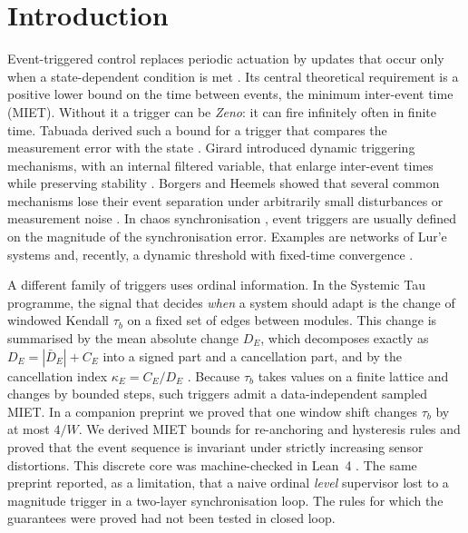 \documentclass[10pt,a4paper]{article}
\begin{document}
\section{Introduction}\label{sec:intro}

Event-triggered control replaces periodic actuation by updates that occur only when a state-dependent condition is met \citep{tabuada2007,heemels2012}. Its central theoretical requirement is a positive lower bound on the time between events, the minimum inter-event time (MIET). Without it a trigger can be \emph{Zeno}: it can fire infinitely often in finite time. Tabuada derived such a bound for a trigger that compares the measurement error with the state \citep{tabuada2007}. Girard introduced dynamic triggering mechanisms, with an internal filtered variable, that enlarge inter-event times while preserving stability \citep{girard2015}. Borgers and Heemels showed that several common mechanisms lose their event separation under arbitrarily small disturbances or measurement noise \citep{borgers2014}. In chaos synchronisation \citep{pecora1990}, event triggers are usually defined on the magnitude of the synchronisation error. Examples are networks of Lur'e systems \citep{liuzhou2016} and, recently, a dynamic threshold with fixed-time convergence \citep{taghavifar2026}.

A different family of triggers uses ordinal information. In the Systemic Tau programme, the signal that decides \emph{when} a system should adapt is the change of windowed Kendall $\tau_b$ \citep{kendall1938,kendall1945} on a fixed set of edges between modules. This change is summarised by the mean absolute change $D_E$, which decomposes exactly as $D_E=|\bar D_E|+C_E$ into a signed part and a cancellation part, and by the cancellation index $\kappa_E=C_E/D_E$ \citep{pv2026cancel,pv2026kappa}. Because $\tau_b$ takes values on a finite lattice and changes by bounded steps, such triggers admit a data-independent sampled MIET. In a companion preprint \citep{pv2026miet} we proved that one window shift changes $\tau_b$ by at most $4/W$. We derived MIET bounds for re-anchoring and hysteresis rules and proved that the event sequence is invariant under strictly increasing sensor distortions. This discrete core was machine-checked in Lean~4 \citep{demoura2021lean4,mathlib2020}. The same preprint reported, as a limitation, that a naive ordinal \emph{level} supervisor lost to a magnitude trigger in a two-layer synchronisation loop. The rules for which the guarantees were proved had not been tested in closed loop.
\end{document}
